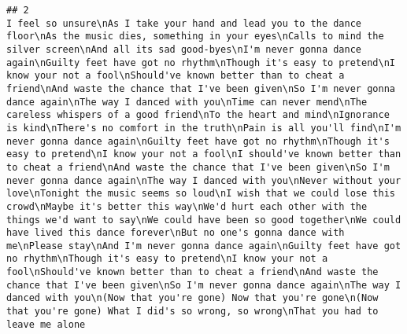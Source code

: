 \documentclass[]{article}
\begin{document}
\begin{verbatim}
## 2                                                                                                                                                                                                                                                                                                                                                                                                                                                                                                                                                                                                                                                                                                                                                                                                                                                                                                                                                                                                                                                                                                                                                                                                                                                                                                                                                                                                                                                                                                               I feel so unsure\nAs I take your hand and lead you to the dance floor\nAs the music dies, something in your eyes\nCalls to mind the silver screen\nAnd all its sad good-byes\nI'm never gonna dance again\nGuilty feet have got no rhythm\nThough it's easy to pretend\nI know your not a fool\nShould've known better than to cheat a friend\nAnd waste the chance that I've been given\nSo I'm never gonna dance again\nThe way I danced with you\nTime can never mend\nThe careless whispers of a good friend\nTo the heart and mind\nIgnorance is kind\nThere's no comfort in the truth\nPain is all you'll find\nI'm never gonna dance again\nGuilty feet have got no rhythm\nThough it's easy to pretend\nI know your not a fool\nI should've known better than to cheat a friend\nAnd waste the chance that I've been given\nSo I'm never gonna dance again\nThe way I danced with you\nNever without your love\nTonight the music seems so loud\nI wish that we could lose this crowd\nMaybe it's better this way\nWe'd hurt each other with the things we'd want to say\nWe could have been so good together\nWe could have lived this dance forever\nBut no one's gonna dance with me\nPlease stay\nAnd I'm never gonna dance again\nGuilty feet have got no rhythm\nThough it's easy to pretend\nI know your not a fool\nShould've known better than to cheat a friend\nAnd waste the chance that I've been given\nSo I'm never gonna dance again\nThe way I danced with you\n(Now that you're gone) Now that you're gone\n(Now that you're gone) What I did's so wrong, so wrong\nThat you had to leave me alone

\end{verbatim}
\end{document}
